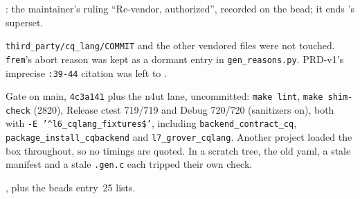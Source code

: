 \begin{figures}
\end{figures}

: the maintainer's ruling ``Re-vendor, authorized'', recorded on
the bead; it ends 's superset.

\texttt{third\_party/cq\_lang/COMMIT} and the other vendored files were not
touched. \texttt{frem}'s abort reason was kept as a dormant entry in
\texttt{gen\_reasons.py}. PRD-v1's imprecise \texttt{:39-44} citation was
left to .

Gate on main, \texttt{4c3a141} plus the n4ut lane, uncommitted:
\texttt{make lint}, \texttt{make shim-check} (2820), Release ctest 719/719
and Debug 720/720 (sanitizers on), both with
\texttt{-E '\^{}l6\_cqlang\_fixtures\$'}, including
\texttt{backend\_contract\_cq}, \texttt{package\_install\_cqbackend} and
\texttt{l7\_grover\_cqlang}. Another project loaded the box throughout, so no
timings are quoted. In a scratch tree, the old yaml, a stale manifest and a
stale \texttt{.gen.c} each tripped their own check.

, plus the beads entry~25 lists.
